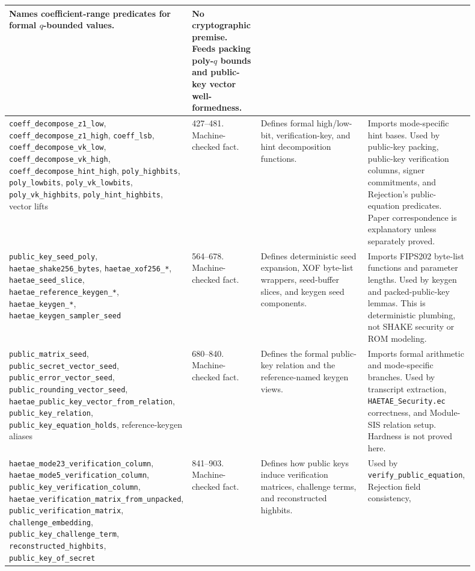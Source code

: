 \documentclass[11pt]{report}
\DeclareRobustCommand{\file}[1]{\ifmmode\text{\nolinkurl{#1}}\else\nolinkurl{#1}\fi}
\DeclareRobustCommand{\ec}[1]{\ifmmode\text{\nolinkurl{#1}}\else\nolinkurl{#1}\fi}
\theoremstyle{definition}
\theoremstyle{plain}
\begin{document}
{\begin{longtable}{p{0.24\linewidth}p{0.15\linewidth}p{0.28\linewidth}p{0.23\linewidth}}
Names coefficient-range predicates for formal \(q\)-bounded values. &
No cryptographic premise.  Feeds packing poly-\(q\) bounds and public-key
vector well-formedness. \\
\midrule
\ec{coeff\_decompose\_z1\_low}, \ec{coeff\_decompose\_z1\_high},
\ec{coeff\_lsb}, \ec{coeff\_decompose\_vk\_low},
\ec{coeff\_decompose\_vk\_high}, \ec{coeff\_decompose\_hint\_high},
\ec{poly\_highbits}, \ec{poly\_lowbits}, \ec{poly\_vk\_lowbits},
\ec{poly\_vk\_highbits}, \ec{poly\_hint\_highbits}, vector lifts &
427--481. Machine-checked fact. &
Defines formal high/low-bit, verification-key, and hint decomposition
functions. &
Imports mode-specific hint bases.  Used by public-key packing, public-key
verification columns, signer commitments, and Rejection's public-equation
predicates.  Paper correspondence is explanatory unless separately proved. \\
\midrule
\ec{public\_key\_seed\_poly}, \ec{haetae\_shake256\_bytes},
\ec{haetae\_xof256\_*}, \ec{haetae\_seed\_slice},
\ec{haetae\_reference\_keygen\_*}, \ec{haetae\_keygen\_*},
\ec{haetae\_keygen\_sampler\_seed} &
564--678. Machine-checked fact. &
Defines deterministic seed expansion, XOF byte-list wrappers, seed-buffer
slices, and keygen seed components. &
Imports FIPS202 byte-list functions and parameter lengths.  Used by keygen and
packed-public-key lemmas.  This is deterministic plumbing, not SHAKE security
or ROM modeling. \\
\midrule
\ec{public\_matrix\_seed}, \ec{public\_secret\_vector\_seed},
\ec{public\_error\_vector\_seed}, \ec{public\_rounding\_vector\_seed},
\ec{haetae\_public\_key\_vector\_from\_relation},
\ec{public\_key\_relation}, \ec{public\_key\_equation\_holds},
reference-keygen aliases &
680--840. Machine-checked fact. &
Defines the formal public-key relation and the reference-named keygen views. &
Imports formal arithmetic and mode-specific branches.  Used by transcript
extraction, \file{HAETAE\_Security.ec} correctness, and Module-SIS relation
setup.  Hardness is not proved here. \\
\midrule
\ec{haetae\_mode23\_verification\_column},
\ec{haetae\_mode5\_verification\_column},
\ec{public\_key\_verification\_column},
\ec{haetae\_verification\_matrix\_from\_unpacked},
\ec{public\_verification\_matrix}, \ec{challenge\_embedding},
\ec{public\_key\_challenge\_term}, \ec{reconstructed\_highbits},
\ec{public\_key\_of\_secret} &
841--903. Machine-checked fact. &
Defines how public keys induce verification matrices, challenge terms, and
reconstructed highbits. &
Used by \ec{verify\_public\_equation}, Rejection field consistency,

\end{longtable}}
\end{document}
